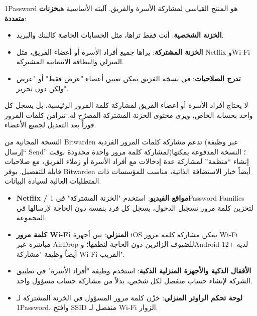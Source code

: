 
1Password هو المنتج القياسي لمشاركة الأسرة والفريق. آليته الأساسية هي\textbf{خزنات متعددة}:

\begin{itemize}
  \item \textbf{الخزنة الشخصية}: أنت فقط تراها، مثل الحسابات الخاصة كالبنك والبريد.
  \item \textbf{الخزنة المشتركة}: يراها جميع أفراد الأسرة أو أعضاء الفريق، مثل Netflix وWi-Fi المنزلي والبطاقة الائتمانية المشتركة.
  \item \textbf{تدرج الصلاحيات}: في نسخة الفريق يمكن تعيين أعضاء "عرض فقط" أو "عرض ولكن دون تحرير".
\end{itemize}

لا يحتاج أفراد الأسرة أو أعضاء الفريق لمشاركة كلمة المرور الرئيسية، بل يسجل كل واحد بحسابه الخاص، ويرى محتوى الخزنة المشتركة المصرّح له. تتزامن كلمات المرور فوراً بعد التعديل لجميع الأعضاء.


النسخة المجانية من Bitwarden تدعم مشاركة كلمات المرور الفردية (عبر وظيفة “إرسال Send” لمشاركة كلمة مرور واحدة محدودة بوقت)؛ النسخة المدفوعة يمكنها إنشاء “منظمة” لمشاركة عدة إدخالات مع أفراد الأسرة أو زملاء الفريق، مع صلاحيات قابلة للتفصيل. يوفر Bitwarden أيضاً خيار الاستضافة الذاتية، مناسب للمؤسسات ذات المتطلبات العالية لسيادة البيانات.


\begin{itemize}
  \item \textbf{Netflix / مواقع الفيديو}: استخدم "الخزنة المشتركة" في 1Password Families لتخزين كلمة مرور تسجيل الدخول، يسجل كل فرد بنفسه دون الحاجة لإرسالها في المجموعة.
  \item \textbf{كلمة مرور Wi-Fi المنزلي}: بين أجهزة iOS يمكن مشاركة كلمة مرور Wi-Fi مباشرة عبر AirDrop للضيوف الزائرين دون الحاجة لنطقها؛ وAndroid 12+ لديه أيضاً وظيفة "مشاركة Wi-Fi القريب".
  \item \textbf{الأقفال الذكية والأجهزة المنزلية الذكية}: استخدم وظيفة "أفراد الأسرة" في تطبيق الشركة لإنشاء حساب منفصل لكل شخص، بدلاً من مشاركة حساب مسؤول واحد.
  \item \textbf{لوحة تحكم الراوتر المنزلي}: خزّن كلمة مرور المسؤول في الخزنة المشتركة لـ 1Password، وافتح SSID منفصل لـ Wi-Fi الزوار.
\end{itemize}

